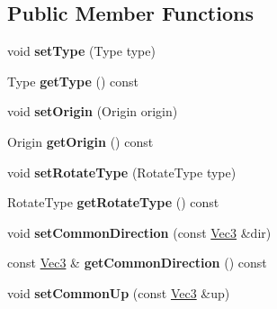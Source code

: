 \subsection*{Public Member Functions}
\begin{DoxyCompactItemize}
\item 
\mbox{\label{classPUParticle3DQuadRender_ac2a1f3d1ae8a96f00f05d9667b8b31d8}} 
void {\bfseries set\+Type} (Type type)
\item 
\mbox{\label{classPUParticle3DQuadRender_aaf9f3f57a3248fbac0faf26c26ba52e5}} 
Type {\bfseries get\+Type} () const
\item 
\mbox{\label{classPUParticle3DQuadRender_a4b2a1ed2d5c3c9fab18e15dae4d220e7}} 
void {\bfseries set\+Origin} (Origin origin)
\item 
\mbox{\label{classPUParticle3DQuadRender_a5b035e9742019dd9bcf842cfa2eeb551}} 
Origin {\bfseries get\+Origin} () const
\item 
\mbox{\label{classPUParticle3DQuadRender_aa174c93343ab3e545a96ab18a387dd18}} 
void {\bfseries set\+Rotate\+Type} (Rotate\+Type type)
\item 
\mbox{\label{classPUParticle3DQuadRender_a01272aa0c3e643eeb0ff0070f99c2463}} 
Rotate\+Type {\bfseries get\+Rotate\+Type} () const
\item 
\mbox{\label{classPUParticle3DQuadRender_a97909a4047c64dca15426651ac2e6ba6}} 
void {\bfseries set\+Common\+Direction} (const \hyperlink{classVec3}{Vec3} \&dir)
\item 
\mbox{\label{classPUParticle3DQuadRender_a9917d25fdc7dc5444b9472260d72f74b}} 
const \hyperlink{classVec3}{Vec3} \& {\bfseries get\+Common\+Direction} () const
\item 
\mbox{\label{classPUParticle3DQuadRender_a366cb21774f442ac060196b8d2749c28}} 
void {\bfseries set\+Common\+Up} (const \hyperlink{classVec3}{Vec3} \&up)
\item 

\end{DoxyCompactItemize}
